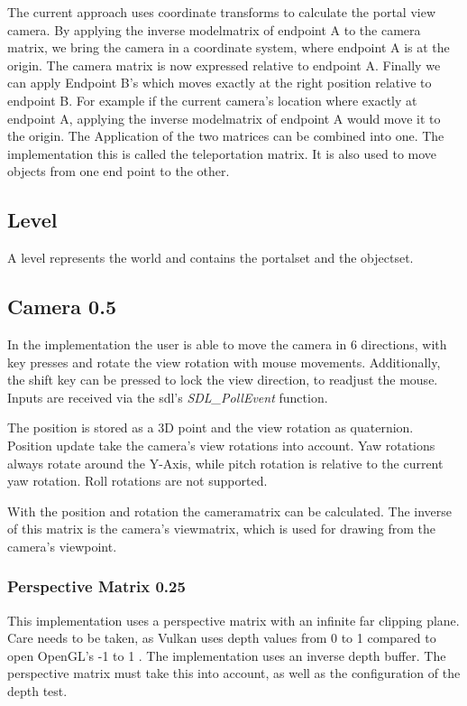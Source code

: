 The current approach uses coordinate transforms to calculate the portal view camera. By applying the inverse modelmatrix of endpoint A to the camera matrix, we bring the camera in a coordinate system, where endpoint A is at the origin. The camera matrix is now expressed relative to endpoint A. Finally we can apply Endpoint B's which moves exactly at the right position relative to endpoint B.
For example if the current camera's location where exactly at endpoint A, applying the inverse modelmatrix of endpoint A would move it to the origin.
The Application of the two matrices can be combined into one. The implementation this is called the teleportation matrix. It is also used to move objects from one end point to the other.  






\subsection{Level}
A level represents the world and contains the \gls{portalset} and the \gls{objectset}.



\subsection{Camera 0.5}
In the implementation the user is able to move the camera in 6 directions, with key presses and rotate the view rotation with mouse movements. Additionally, the shift key can be pressed to lock the view direction, to readjust the mouse. Inputs are received via the \gls{sdl}'s \cite{sdl} \textit{SDL\_PollEvent} function.

The position is stored as a 3D point and the view rotation as quaternion. Position update take the camera's view rotations into account. Yaw rotations always rotate around the Y-Axis, while pitch rotation is relative to the current yaw rotation. Roll rotations are not supported.

With the position and rotation the \gls{cameramatrix} can be calculated. The inverse of this matrix is the camera's \gls{viewmatrix}, which is used for drawing from the camera's viewpoint.

\subsubsection{Perspective Matrix 0.25}
This implementation uses a perspective matrix with an infinite far clipping plane. Care needs to be taken, as Vulkan uses depth values from 0 to 1 \cite{khronos:vulkan:spec1.1} compared to open OpenGL's -1 to 1 \cite{khronos:openGL:spec4.6}. The implementation uses an inverse depth buffer. The perspective matrix must take this into account, as well as the configuration of the depth test.





